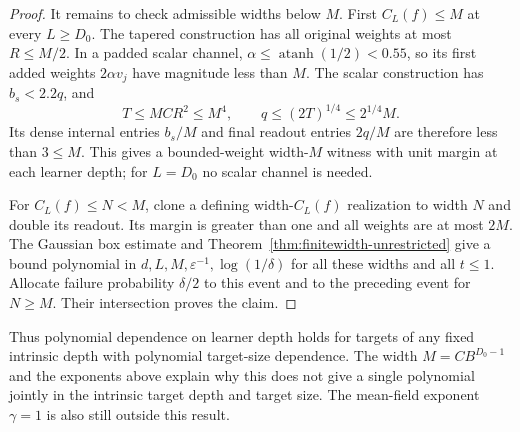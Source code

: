 \begin{proof}
It remains to check admissible widths below $M$.
First $C_L(f)\le M$ at every $L\ge D_0$.
The tapered construction has all original weights at most $R\le M/2$.
In a padded scalar channel, $\alpha\le\operatorname{atanh}(1/2)<0.55$,
so its first added weights $2\alpha v_j$ have magnitude less than $M$.
The scalar construction has $b_s<2.2q$, and
\[
 T\le MC R^2\le M^4,\qquad
 q\le(2T)^{1/4}\le2^{1/4}M.
\]
Its dense internal entries $b_s/M$ and final readout entries $2q/M$
are therefore less than $3\le M$.
This gives a bounded-weight width-$M$ witness with unit margin at each
learner depth; for $L=D_0$ no scalar channel is needed.

For $C_L(f)\le N<M$, clone a defining width-$C_L(f)$ realization to
width $N$ and double its readout. Its margin is greater than one and
all weights are at most $2M$. The Gaussian box estimate and
Theorem~\ref{thm:finitewidth-unrestricted} give a bound polynomial in
$d,L,M,\varepsilon^{-1},\log(1/\delta)$ for all these widths and all
$t\le1$. Allocate failure probability $\delta/2$ to this event and to
the preceding event for $N\ge M$. Their intersection proves the claim.
\end{proof}

Thus polynomial dependence on learner depth holds for targets of any
fixed intrinsic depth with polynomial target-size dependence. The width
$M=CB^{D_0-1}$ and the exponents above explain why this does not give a
single polynomial jointly in the intrinsic target depth and target size.
The mean-field exponent $\gamma=1$ is also still outside this result.
